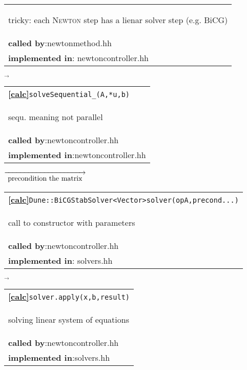 \begin{landscape}
{\begin{tabular}{|l|}
      \begin{scriptsize}tricky: each \textsc{Newton} step has a lienar solver step (e.g. BiCG)\end{scriptsize}\\      
      \textbf{called by}:newtonmethod.hh\\
      \textbf{implemented in}: newtoncontroller.hh\\  
      \hline 
  \end{tabular}
    $\overrightarrow{
    }$
     \begin{tabular}{|l|}
      \hline
      \textbf{\textcircled{\ref{calc}}}\verb+solveSequential_(A,*u,b)+ \\
      \begin{scriptsize}sequ. meaning not parallel\end{scriptsize}\\      \textbf{called by}:newtoncontroller.hh\\
      \textbf{implemented in}:newtoncontroller.hh \\  
	\hline 
  \end{tabular}
\nextline
    {\scriptsize$\overrightarrow{
    \begin{array}{l}
     \textnormal{precondition the matrix}\\
    \end{array}
    }$}
     \begin{tabular}{|l|}
      \hline
      \textbf{\textcircled{\ref{calc}}}\verb+Dune::BiCGStabSolver<Vector>solver(opA,precond...)+ \\
      \begin{scriptsize}call to constructor with parameters\end{scriptsize}\\
      \textbf{called by}:newtoncontroller.hh\\
      \textbf{implemented in}: solvers.hh\\  
      \hline 
  \end{tabular}
    $\overrightarrow{
    }$
    \begin{tabular}{|l|}
      \hline
      \textbf{\textcircled{\ref{calc}}}\verb+solver.apply(x,b,result)+ \\
      \begin{scriptsize}solving linear system of equations\end{scriptsize}\\
      \textbf{called by}:newtoncontroller.hh\\
      \textbf{implemented in}:solvers.hh \\  

\end{tabular}}
\end{landscape}
